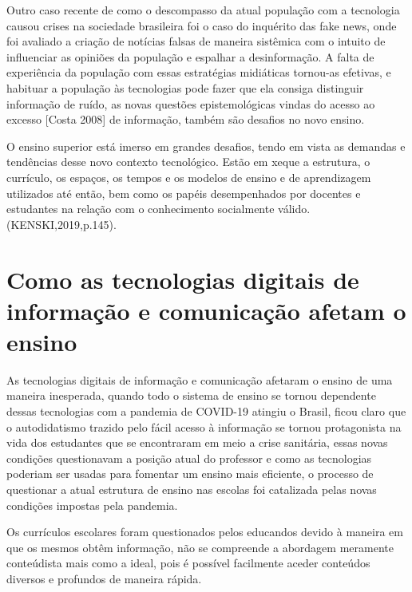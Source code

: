 \documentclass[article, 11pt, oneside, a4paper, english, brazil, sumario=tradicional]{abntex2}
\begin{document}
    Outro caso recente de como o descompasso da atual população com a tecnologia
    causou crises na sociedade brasileira foi o caso do inquérito das fake news,
    onde foi avaliado a criação de notícias falsas de maneira sistêmica com o
    intuito de influenciar as opiniões da população e espalhar a desinformação.
    A falta de experiência da população com essas estratégias midiáticas
    tornou-as efetivas, e habituar a população às tecnologias pode fazer que ela
    consiga distinguir informação de ruído, as novas questões epistemológicas
    vindas do acesso ao excesso [Costa 2008] de informação, também são desafios
    no novo ensino.

\begin{citacao}
O ensino superior está imerso em grandes desafios, tendo em vista as demandas e
tendências desse novo contexto tecnológico. Estão em xeque a estrutura, o
currículo, os  espaços,  os  tempos  e  os  modelos  de  ensino  e  de
aprendizagem  utilizados  até então,  bem como  os  papéis  desempenhados  por
docentes  e  estudantes  na  relação com o conhecimento socialmente válido.
(KENSKI,2019,p.145).
\end{citacao}

\section{Como as tecnologias digitais de informação e comunicação afetam o ensino}
    As tecnologias digitais de informação e comunicação afetaram o ensino
de uma maneira inesperada, quando todo o sistema de ensino se tornou dependente dessas tecnologias
com a pandemia de COVID-19 atingiu o Brasil, ficou claro que o autodidatismo trazido pelo fácil
acesso à informação se tornou protagonista na vida dos estudantes que se encontraram em meio a crise
sanitária, essas novas condições questionavam a posição atual do professor e como as tecnologias poderiam ser usadas
para fomentar um ensino mais eficiente, o processo de questionar a atual estrutura de ensino nas escolas foi
catalizada pelas novas condições impostas pela pandemia.

    Os currículos escolares foram questionados pelos educandos devido à maneira
em que os mesmos obtêm informação, não se compreende a abordagem meramente
conteúdista mais como a ideal, pois é possível facilmente aceder conteúdos
diversos e profundos de maneira rápida.
\end{document}

